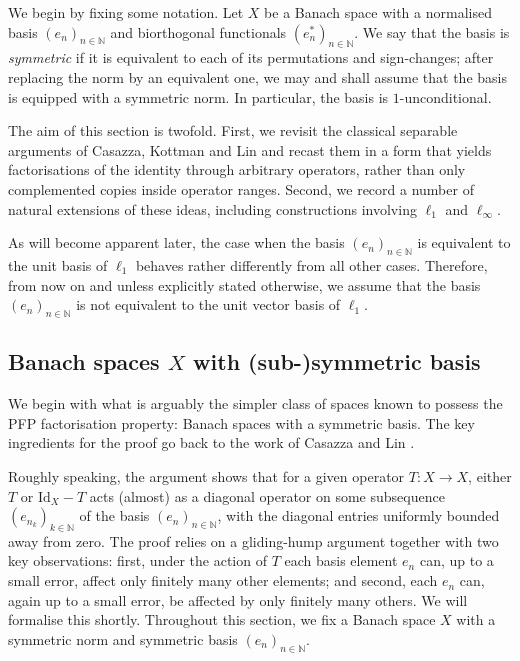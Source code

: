 \documentclass[11pt]{amsart}
\theoremstyle{plain}
\theoremstyle{definition}
\numberwithin{equation}{section}
\newcommand{\N}{\mathbb{N}}
\newcommand{\Id}{\mathrm{Id}}
\begin{document}
We begin by fixing some notation. Let $X$ be a Banach space with a normalised basis $(e_n)_{n\in\N}$ and biorthogonal functionals $(e_n^*)_{n\in\N}$. We say that the basis is \emph{symmetric} if it is equivalent to each of its permutations and sign-changes; after replacing the norm by an equivalent one, we may and shall assume that the basis is equipped with a symmetric norm. In particular, the basis is $1$-unconditional.

The aim of this section is twofold. First, we revisit the classical separable arguments of Casazza, Kottman and Lin and recast them in a form that yields factorisations of the identity through arbitrary operators, rather than only complemented copies inside operator ranges. Second, we record a number of natural extensions of these ideas, including constructions involving $\ell_1$ and $\ell_\infty$.

As will become apparent later, the case when the basis $(e_n)_{n \in \mathbb{N}}$ is equivalent to the unit basis of $\ell_1$ behaves rather differently from all other cases. Therefore, from now on and unless explicitly stated otherwise, we assume that the basis $(e_n)_{n \in \mathbb{N}}$ is not equivalent to the unit vector basis of $\ell_1$. 

\subsection{Banach spaces \texorpdfstring{$X$}{X} with  (sub-)symmetric basis} \label{subsec: symmetric-basis-separable}

We begin with what is arguably the simpler class of spaces known to possess the PFP factorisation property: Banach spaces with a symmetric basis. The key ingredients for the proof go back to the work of Casazza and Lin \cite{CasazzaLin1974}. 

Roughly speaking, the argument shows that for a given operator $T \colon  X \to X$, either $T$ or $\Id_X-T$ acts (almost) as a diagonal operator on some subsequence $(e_{n_k})_{k \in \mathbb{N}}$ of the basis $(e_n)_{n \in \mathbb{N}}$, with the diagonal entries uniformly bounded away from zero. The proof relies on a gliding-hump argument together with two key observations: first, under the action of $T$ each basis element $e_n$ can, up to a small error, affect only finitely many other elements; and second, each $e_n$ can, again up to a small error, be affected by only finitely many others. We will formalise this shortly. Throughout this section, we fix a Banach space $X$ with a symmetric norm and symmetric basis $(e_n)_{n \in \N}$.
\end{document}
